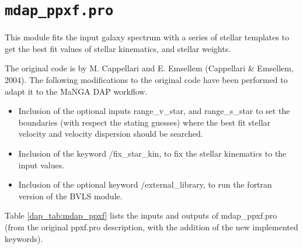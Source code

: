 \section{{\tt mdap\_ppxf.pro}}
\label{dap_sec:mdap_ppxf}

This module fits the input galaxy spectrum with a series of stellar
templates to get the best fit values of stellar kinematics, and
stellar weights.

The original code is by M. Cappellari and E. Emsellem (Cappellari \&
Emsellem, 2004). The following modifications to the original code have
been performed to adapt it to the MaNGA DAP workflow.

\begin{itemize}

\item Inclusion of the optional inputs range\_v\_star, and
  range\_s\_star to set the boundaries (with respect the stating
  guesses) where the best fit stellar velocity and velocity dispersion
  should be searched.

\item Inclusion of the keyword /fix\_star\_kin, to fix the stellar
  kinematics to the input values.

\item Inclusion of the optional keyword /external\_library, to run the
  fortran version of the BVLS module.

\end{itemize}


Table \ref{dap_tab:mdap_ppxf} lists the inputs and outputs of
mdap\_ppxf.pro (from the original ppxf.pro description, with the
addition of the new implemented keywords).



